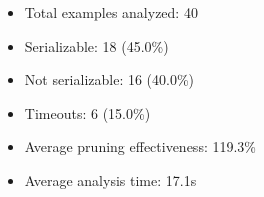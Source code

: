 \begin{itemize}
\item Total examples analyzed: 40
\item Serializable: 18 (45.0\%)
\item Not serializable: 16 (40.0\%)
\item Timeouts: 6 (15.0\%)
\item Average pruning effectiveness: 119.3\%
\item Average analysis time: 17.1s
\end{itemize}

